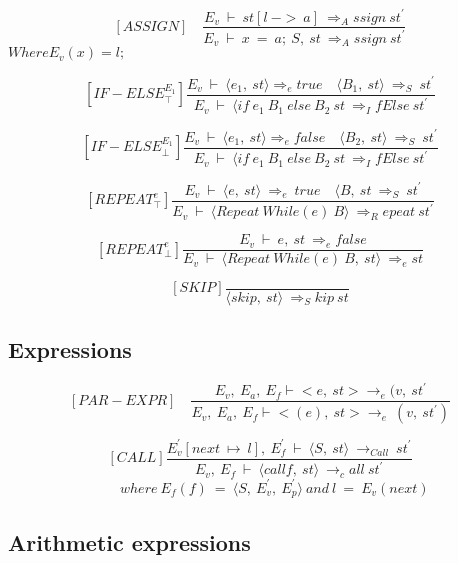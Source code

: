    	\[
   	[ASSIGN] \quad
   	\dfrac{E_v \ \vdash \ st[l \ -> \ a] \ \Rightarrow_Assign \ st^{'}}{E_v \ \vdash \ x \ = \ a; \ S, \ st \ \Rightarrow_Assign \ st^{'}}
   	\]
   	\begin{math}
   		Where E_v(x) = l;
   	\end{math}
   	
   	\[
   	[IF-ELSE^{E_1}_\top]
   	\dfrac{E_v \ \vdash \ \langle e_1, \ st \rangle \Rightarrow_e true \quad \langle B_1, \ st \rangle \ \Rightarrow_S \ st^{'}}{E_v \ \vdash \ \langle if \ e_1 \ B_1 \ else \ B_2 \ st \ \Rightarrow_IfElse \ st^{'}}
   	\]
   	
   	\[
   	[IF-ELSE^{E_1}_\bot]
   	\dfrac{E_v \ \vdash \ \langle e_1, \ st \rangle \Rightarrow_e false \quad \langle B_2, \ st \rangle \ \Rightarrow_S \ st^{'}}{E_v \ \vdash \ \langle if \ e_1 \ B_1 \ else \ B_2 \ st \ \Rightarrow_IfElse \ st^{'}}
   	\]
   	
   	\[
   	[REPEAT^e_\top]
   	\dfrac{E_v \ \vdash \ \langle e, \ st \rangle \ \Rightarrow_e \ true \quad \langle B, \ st \ \Rightarrow_S \ st^{'}}{E_v \ \vdash \ \langle Repeat \ While(e) \ B \rangle \ \Rightarrow_Repeat \ st^{'}}
   	\]
   	
   	\[
   	[REPEAT^e_\bot]
   	\dfrac{E_v \ \vdash \ e, \ st \ \Rightarrow_e false}{E_v \ \vdash \ \langle Repeat \ While(e) \ B, \ st\rangle \ \Rightarrow_e st}
   	\]
   	
   	\[
   	[SKIP]
   	\dfrac{}{\langle skip, \ st \rangle \ \Rightarrow_Skip \ st}
   	\]
   	
   	\subsection{Expressions}
   	
   	\[
   	[PAR-EXPR] \quad
   	\dfrac{E_v, \ E_a, \ E_f \vdash <e, \ st> \rightarrow_e (v, \ st^{'}}{E_v, \ E_a, \ E_f \vdash <(e), \ st> \rightarrow_e \ (v, \ st^{'})}
   	\]
   	
	\[
	[CALL]
	\dfrac{E_v^{'}[next \ \mapsto \ l], \ E_f^{'} \ \vdash \ \langle S, \ st \rangle \ \rightarrow_{Call} \ st^{'}}{E_v, \ E_f \ \vdash \ \langle call f, \ st \rangle \ \rightarrow_call \ st^{'}}
	\]
	\begin{math}		
		\qquad \qquad \qquad \qquad where \ E_f(f) \ = \ \langle S, \ E_v^{'}, \ E_p^{'} \rangle \
		and \ l \ = \ E_v(next)
	\end{math}
   	
   	\subsection{Arithmetic expressions}
   	
